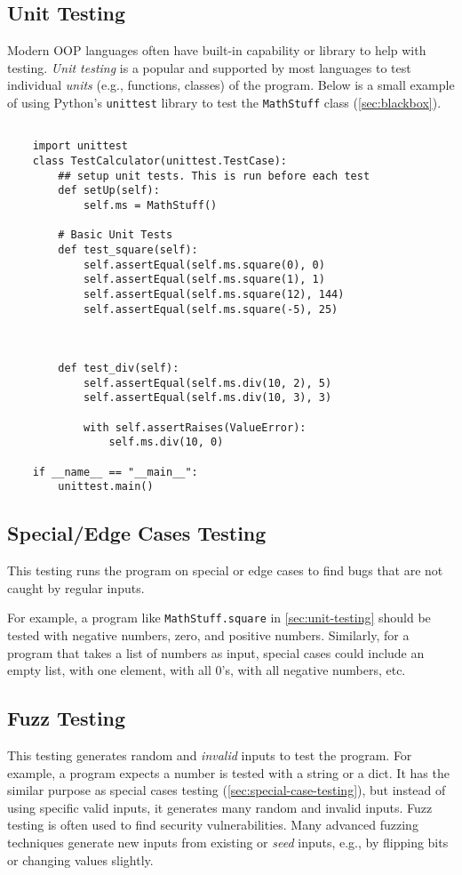 \documentclass[oneside,11pt,dvipsnames]{book}
\newcommand{\code}[1]{\texttt{#1}}
\begin{document}
\subsection{Unit Testing}\label{sec:unit-testing}

Modern OOP languages often have built-in capability or library to help with testing. \emph{Unit testing} is a popular and supported by most languages to test individual \emph{units} (e.g., functions, classes) of the program. Below is a small example of using Python's \code{unittest} library to test the \code{MathStuff} class (\autoref{sec:blackbox}).

\begin{lstlisting}

    import unittest
    class TestCalculator(unittest.TestCase):
        ## setup unit tests. This is run before each test    
        def setUp(self):
            self.ms = MathStuff()
    
        # Basic Unit Tests
        def test_square(self):
            self.assertEqual(self.ms.square(0), 0)
            self.assertEqual(self.ms.square(1), 1)
            self.assertEqual(self.ms.square(12), 144)
            self.assertEqual(self.ms.square(-5), 25)
    

    
        def test_div(self):
            self.assertEqual(self.ms.div(10, 2), 5)
            self.assertEqual(self.ms.div(10, 3), 3)

            with self.assertRaises(ValueError):
                self.ms.div(10, 0)
    
    if __name__ == "__main__":
        unittest.main()
\end{lstlisting}


\subsection{Special/Edge Cases Testing}\label{sec:special-case-testing}

This testing runs the program on special or edge cases to find bugs that are not caught by regular inputs.


For example, a program like \code{MathStuff.square} in \autoref{sec:unit-testing} should be tested with negative numbers, zero, and positive numbers. Similarly, for a program that takes a list of numbers as input, special cases could include an empty list, with one element, with all 0's, with all negative numbers, etc.


\subsection{Fuzz Testing}
This testing generates random and \emph{invalid} inputs to test the program. For example, a program expects a number is tested with a string or a dict.  It has the similar purpose as special cases testing (\autoref{sec:special-case-testing}), but instead of using specific valid inputs, it generates many random and invalid inputs. Fuzz testing is often used to find security vulnerabilities. Many advanced fuzzing techniques generate new inputs from existing or \emph{seed} inputs, e.g., by flipping bits or changing values slightly.
\end{document}
